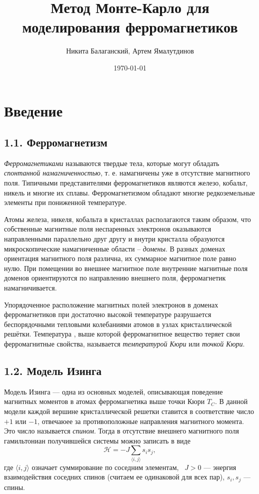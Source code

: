 \documentclass[12pt]{report}
\title{Метод Монте-Карло для моделирования ферромагнетиков}
\author{Никита Балаганский, Артем Ямалутдинов}
\date{\today}
\theoremstyle{definition}
\begin{document}
\maketitle
{}
%
\thispagestyle{fancy}
\newpage
\chapter{Введение}
\section{1.1. Ферромагнетизм}
\emph{Ферромагнетиками} называются твердые тела, которые могут обладать \emph{спонтанной намагниченностью}, т. е. намагничены уже в отсутствие магнитного поля.
Типичными представителями ферромагнетиков являются железо, кобальт, никель и многие их сплавы. Ферромагнетизмом обладают многие редкоземельные элементы при пониженной температуре.

Атомы железа, никеля, кобальта в кристаллах располагаются таким образом, что собственные магнитные поля неспаренных электронов оказываются направленными параллельно друг другу и внутри кристалла образуются микроскопические намагниченные области – \emph{домены}.
В разных доменах ориентация магнитного поля различна, их суммарное магнитное поле равно нулю. 
При помещении во внешнее магнитное поле внутренние магнитные поля доменов ориентируются по направлению внешнего поля, ферромагнетик намагничивается.

Упорядоченное расположение магнитных полей электронов в доменах ферромагнетиков при достаточно высокой температуре разрушается беспорядочными тепловыми колебаниями атомов в узлах кристаллической решётки.
Температура , выше которой ферромагнитное вещество теряет свои ферромагнитные свойства, называется \emph{температурой Кюри} или \emph{точкой Кюри}.

\section{1.2. Модель Изинга}
Модель Изинга --- одна из основных моделей, описывающая поведение магнитных моментов 
в атомах ферромагнетика выше точки Кюри $T_C$. В данной модели каждой вершине кристаллической решетки ставится в соответствие число $+1$ или $-1$, 
отвечаюее за противоположные направления магнитного момента. Это число называется \emph{спином}. Тогда в отсутствие внешнего магнитного поля гамильтониан получившейся системы можно записать в виде
\begin{equation}\label{eq:energy}
    \mathcal{H} = -J\sum_{\langle i, j \rangle}s_is_j,
\end{equation}
где $\langle i, j \rangle$ означает суммирование по соседним элементам,  $J > 0$ --- энергия взаимодействия соседних спинов (считаем ее одинаковой для всех пар),
$s_i, s_j$ --- спины.
\end{document}
